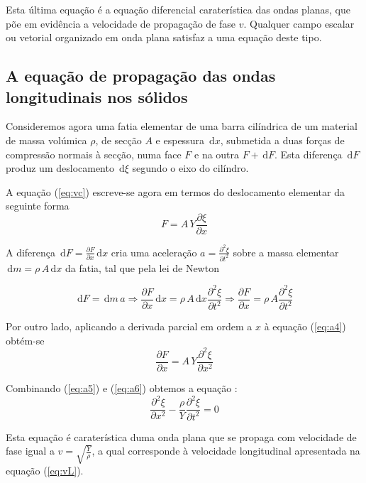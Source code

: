 \documentclass[a4paper,12pt]{article}
\newcommand{\ud}{\,\mathrm{d}}
\begin{document}
Esta última equação é a equação diferencial caraterística das ondas planas, que põe em evidência a velocidade de propagação de fase $v$. Qualquer campo escalar ou vetorial organizado em onda plana satisfaz a uma equação deste tipo.

\subsection{\sf A equação de propagação das ondas longitudinais nos sólidos} 


Consideremos agora uma fatia elementar de uma barra cilíndrica de um material de massa volúmica $\rho$, de secção $A$ e espessura $\ud x$, submetida a duas forças de compressão normais à secção, numa face $F$ e na outra $F+\ud F$. Esta diferença $\ud F$ produz um deslocamento  $\ud \xi$  segundo o eixo do cilíndro.

A equação (\ref{eq:vc}) escreve-se agora em termos do deslocamento elementar da seguinte forma
\begin{equation}
	\label{eq:a4}
	 F = A \, Y \frac{\partial \xi }{\partial x} 
\end{equation}

A diferença $\ud F = \frac{\partial F }{\partial x} \ud x $ cria uma aceleração $a=\frac{\partial^2 \xi }{\partial t^2} $  sobre a massa elementar $\ud m= \rho\,A \ud x $ da fatia, tal que pela lei de Newton

\begin{equation}
	\label{eq:a5}
	 \ud F=\ud m\,a\Rightarrow \frac{\partial F }{\partial x} \ud x  =  \rho\,A \ud x \frac{\partial^2 \xi }{\partial t^2} \Rightarrow \frac{\partial F }{\partial x} = \rho\,A  \frac{\partial^2 \xi }{\partial t^2}
\end{equation}

Por outro lado, aplicando a derivada parcial em ordem a $x$ à equação (\ref{eq:a4}) obtém-se
\begin{equation}
	\label{eq:a6}
	\frac{\partial F }{\partial x} = A \, Y \frac{\partial^2 \xi }{\partial x^2}
\end{equation}	

Combinando (\ref{eq:a5}) e (\ref{eq:a6}) obtemos a equação :
\begin{equation}
	\label{eq:a7}
	\frac{\partial^2 \xi }{\partial x^2} - \frac{\rho}{Y} \frac{\partial^2 \xi }{\partial t^2} =0
\end{equation}	

Esta equação é caraterística duma onda plana que se propaga com velocidade de fase igual a $v=\sqrt{\frac{Y}{\rho}}$, a qual corresponde à velocidade longitudinal apresentada na equação (\ref{eq:vL}). 
\end{document}
